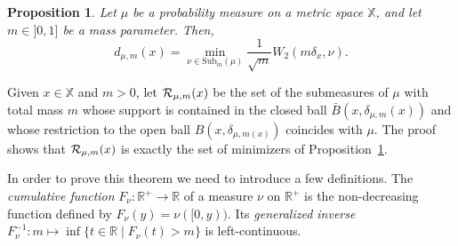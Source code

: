 \documentclass[a4paper]{article}
\newcommand\dm{d_{\mu,m}}
\newcommand\X{\mathbb{X}}
\newcommand\R{\mathbb{R}}
\newcommand\Sub[2]{\mathrm{Sub}_#1(#2)}
\newtheorem{proposition}[theorem]{Proposition}
\begin{document}
\begin{proposition}\label{Wwriting}
Let $\mu$ be a probability measure on a metric space $\X$, and let $m\in ]0,1]$ be a mass parameter. Then,
\[
  \dm(x)=\min_{\nu\in \Sub{m}{\mu}}\frac{1}{\sqrt{m}}W_2(m\delta_x,\nu).
\]
\end{proposition}

Given $x\in\X$ and $m>0$, let ${\cal{R}}_{\mu,m}(x)$ be the set of the submeasures of $\mu$ with total mass $m$ whose support is contained in the closed ball $\bar{B}(x,\delta_{\mu,m}(x))$ and whose restriction to the open ball $B(x,\delta_{\mu,m(x)})$ coincides with $\mu$.
The proof shows that ${\cal{R}}_{\mu,m}(x)$ is exactly the set of minimizers of Proposition~\ref{Wwriting}. 


In order to prove this theorem we need to introduce a few definitions.
The \emph{cumulative function} $F_\nu:\R^+\rightarrow\R$ of a measure $\nu$ on $\R^+$ is the non-decreasing function defined by $F_\nu(y)=\nu([0,y))$.
Its \emph{generalized inverse} $F_\nu^{-1}:m\mapsto\inf\{t\in\R\mid F_\nu(t)>m\}$ is left-continuous. 
\end{document}

